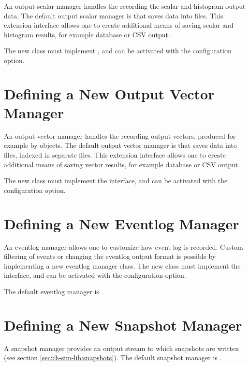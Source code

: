 An output scalar manager handles the recording the scalar and histogram
output data. The default output scalar manager is
 that saves data into  files.
This extension interface allows one to create additional means of saving
scalar and histogram results, for example database or CSV output.

The new class must implement , and can be
activated with the  configuration
option.


\section{Defining a New Output Vector Manager}
\label{sec:plugin-exts:outputvectormanager}

An output vector manager handles the recording output vectors, produced
for example by  objects. The default output vector
manager is  that saves data into
 files, indexed in separate  files. This extension
interface allows one to create additional means of saving vector results,
for example database or CSV output.

The new class must implement the  interface,
and can be activated with the 
configuration option.


\section{Defining a New Eventlog Manager}
\label{sec:plugin-exts:eventlogmanager}

An eventlog manager allows one to customize how event log is recorded.
Custom filtering of events or changing the eventlog output format is possible
by implementing a new eventlog manager class. The new class must implement
the  interface, and can be activated with the
 configuration option.

The default eventlog manager is .

\section{Defining a New Snapshot Manager}
\label{sec:plugin-exts:snapshotmanager}

A snapshot manager provides an output stream to which snapshots are written
(see section \ref{sec:ch-sim-lib:snapshots}). The default snapshot manager
is .

